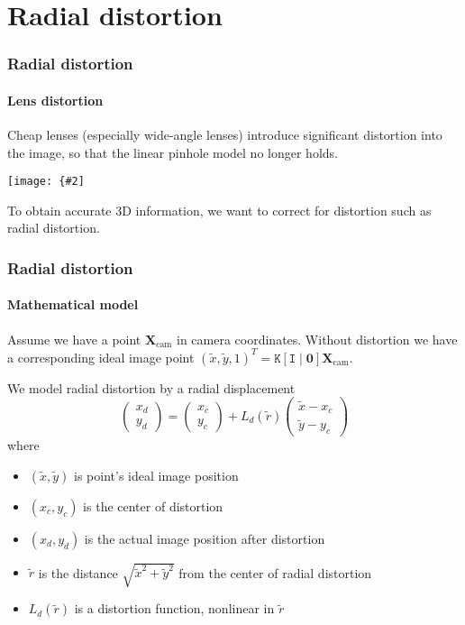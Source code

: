 \documentclass[aspectratio=169]{beamer}
\renewcommand{\vec}[1]{\boldsymbol{#1}}
\newcommand{\mat}[1]{\mathtt{#1}}
\newcommand{\myfig}[3]{\centerline{\texttt{[image: \{\#2]}}}
    \centerline{\scriptsize #3}}
\begin{document}
\section{Radial distortion}

\begin{frame}
\frametitle{Radial distortion}
\framesubtitle{Lens distortion}

\alert{Cheap lenses} (especially wide-angle lenses) introduce
significant \alert{distortion} into the image, so that the
\alert{linear pinhole model no longer holds}.

\bigskip

\myfig{4in}{HZ-fig6-5}{Hartley and Zisserman (2005), Fig.\ 6.5}

\medskip

To obtain accurate 3D information, we want to \alert{correct for
  distortion} such as radial distortion.

\end{frame}

\begin{frame}
\frametitle{Radial distortion}
\framesubtitle{Mathematical model}

Assume we have a point $\vec{X}_{\text{cam}}$ in camera coordinates.
Without distortion we have a corresponding \alert{ideal image point}
$(\tilde{x},\tilde{y},1)^T=\mat{K}[\mat{I} \mid
\vec{0}]\vec{X}_{\text{cam}}$.

\medskip

We model \alert{radial distortion} by a radial displacement
\begin{equation*}
\begin{pmatrix} x_d \\ y_d \end{pmatrix} =
\begin{pmatrix} x_c \\ y_c \end{pmatrix} +
L_d(\tilde{r}) \begin{pmatrix} \tilde{x}-x_c \\ \tilde{y}-y_c \end{pmatrix}
\end{equation*}
where
\begin{itemize}
\item $(\tilde{x},\tilde{y})$ is point's \alert{ideal image position}
\item $(x_c,y_c)$ is the \alert{center of distortion}
\item $(x_d,y_d)$ is the \alert{actual image position} after distortion
\item $\tilde{r}$ is the \alert{distance} $\sqrt{\tilde{x}^2+\tilde{y}^2}$
  from the \alert{center} of radial distortion
\item $L_d(\tilde{r})$ is a distortion function, nonlinear in $\tilde{r}$
\end{itemize}

\end{frame}
\end{document}
